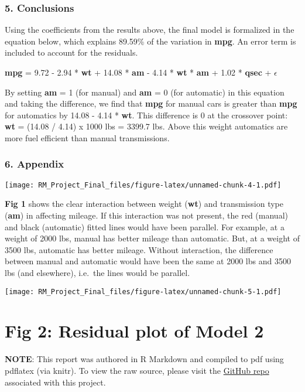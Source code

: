 \documentclass[10pt,]{article}
\begin{document}
\subsubsection{5. Conclusions}\label{conclusions}

Using the coefficients from the results above, the final model is
formalized in the equation below, which explains 89.59\% of the
variation in \textbf{mpg}. An error term is included to account for the
residuals.

\textbf{mpg} = 9.72 - 2.94 * \textbf{wt} + 14.08 * \textbf{am} - 4.14 *
\textbf{wt} * \textbf{am} + 1.02 * \textbf{qsec} + \(\epsilon\)

By setting \textbf{am} = 1 (for manual) and \textbf{am} = 0 (for
automatic) in this equation and taking the difference, we find that
\textbf{mpg} for manual cars is greater than \textbf{mpg} for automatics
by 14.08 - 4.14 * \textbf{wt}. This difference is 0 at the crossover
point: \textbf{wt} = (14.08 / 4.14) x 1000 lbs = 3399.7 lbs. Above this
weight automatics are more fuel efficient than manual transmissions.

\newpage

\subsubsection{6. Appendix}\label{appendix}

\texttt{[image: RM\_Project\_Final\_files/figure-latex/unnamed-chunk-4-1.pdf]}

\textbf{Fig 1} shows the clear interaction between weight (\textbf{wt})
and transmission type (\textbf{am}) in affecting mileage. If this
interaction was not present, the red (manual) and black (automatic)
fitted lines would have been parallel. For example, at a weight of 2000
lbs, manual has better mileage than automatic. But, at a weight of 3500
lbs, automatic has better mileage. Without interaction, the difference
between manual and automatic would have been the same at 2000 lbs and
3500 lbs (and elsewhere), i.e.~the lines would be parallel.

\texttt{[image: RM\_Project\_Final\_files/figure-latex/unnamed-chunk-5-1.pdf]}

\section{Fig 2: Residual plot of Model
2}\label{fig-2-residual-plot-of-model-2}

\textbf{NOTE}: This report was authored in R Markdown and compiled to
pdf using pdflatex (via knitr). To view the raw source, please visit the
\href{https://github.com/rswamidasan/Regression-Models}{GitHub repo}
associated with this project.
\end{document}
